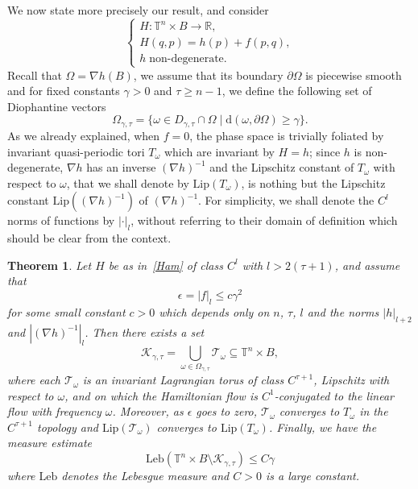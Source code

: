 \documentclass[11pt]{article}
\let\mathcal\mathscr
\let\sep\mid
\numberwithin{equation}{section}
\theoremstyle{plain}
\newtheorem{Main}{Theorem}
\theoremstyle{definition}
\newcommand{\R}{\mathbb{R}}
\newcommand\T{\mathbb T}
\begin{document}
We now state more precisely our result, and consider
\begin{equation}\label{Ham}
\begin{cases}
H : \T^n \times B \to \R, \\
H(q,p)=h(p)+f(p,q), \\
h \; \mbox{non-degenerate}.
\end{cases}
\tag{$*$}
\end{equation}
Recall that $\Omega=\nabla h(B)$, we assume that its boundary $\partial \Omega$ is piecewise smooth and for fixed constants $\gamma >0$ and $\tau \geq n-1$, we define the following set of Diophantine vectors
\begin{equation*}
\Omega_{\gamma,\tau}=\{\omega \in D_{\gamma,\tau} \cap \Omega \sep \mathrm{d}(\omega,\partial\Omega) \geq \gamma\}.
\end{equation*}
As we already explained, when $f=0$, the phase space is trivially foliated by invariant quasi-periodic tori $T_\omega$ which are invariant by $H=h$; since $h$ is non-degenerate, $\nabla h$ has an inverse $(\nabla h)^{-1}$ and the Lipschitz constant of $T_\omega$ with respect to $\omega$, that we shall denote by $\mathrm{Lip}(T_\omega)$, is nothing but the Lipschitz constant $\mathrm{Lip}((\nabla h)^{-1})$ of $(\nabla h)^{-1}$. For simplicity, we shall denote the $C^l$ norms of functions by $|{\cdot}|_l$, without referring to their domain of definition which should be clear from the context.

\begin{Main}\label{thm1}
Let $H$ be as in~\eqref{Ham} of class $C^l$ with $l>2(\tau+1)$, and assume that
\begin{equation}\label{seuila}
\epsilon=|f|_l \leq c \gamma^2
\end{equation}
for some small constant $c>0$ which depends only on $n$, $\tau$, $l$ and the norms $|h|_{l+2}$ and $|(\nabla h)^{-1}|_{l}$. Then there exists a set
\[ \mathcal{K}_{\gamma,\tau}=\bigcup_{\omega \in \Omega_{\gamma,\tau}}\mathcal{T}_\omega \subseteq \T^n \times B, \]
where each $\mathcal{T}_\omega$ is an invariant Lagrangian torus of class $C^{\tau+1}$, Lipschitz with respect to $\omega$, and on which the Hamiltonian flow is $C^{1}$-conjugated to the linear flow with frequency $\omega$. Moreover, as $\epsilon$ goes to zero, $\mathcal{T}_\omega$ converges to $T_\omega$ in the $C^{\tau+1}$ topology and $\mathrm{Lip}(\mathcal{T}_\omega)$ converges to $\mathrm{Lip}(T_\omega)$. Finally, we have the measure estimate
\[ \mathrm{Leb}(\T^n \times B \setminus \mathcal{K}_{\gamma,\tau}) \leq C\gamma \]
where $ \mathrm{Leb}$ denotes the Lebesgue measure and $C>0$ is a large constant.
\end{Main}
\end{document}
